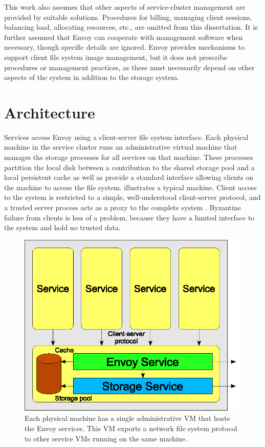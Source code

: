 This work also assumes that other aspects of service-cluster management are provided by suitable solutions. Procedures for billing, managing client sessions, balancing load, allocating resources, etc., are omitted from this dissertation. It is further assumed that Envoy can cooperate with management software when necessary, though specific details are ignored. Envoy provides mechanisms to support client file system image management, but it does not prescribe procedures or management practices, as these must necessarily depend on other aspects of the system in addition to the storage system.

\section{Architecture}

Services access Envoy using a client-server file system interface. Each physical machine in the service cluster runs an administrative virtual machine that manages the storage processes for all services on that machine. These processes partition the local disk between a contribution to the shared storage pool and a local persistent cache as well as provide a standard interface allowing clients on the machine to access the file system.  illustrates a typical machine. Client access to the system is restricted to a simple, well-understood client-server protocol, and a trusted server process acts as a proxy to the complete system \cite{shapiro}. Byzantine failure from clients is less of a problem, because they have a limited interface to the system and hold no trusted data.

\begin{figure}[tp]
\centering
\includegraphics[width=\figwidth]{figures/single-machine}
\caption[Layout of Envoy services in a single machine]{Each physical machine has a single administrative VM that hosts the Envoy services. This VM exports a network file system protocol to other service VMs running on the same machine.}
\label{fig:single-machine}
\end{figure}

